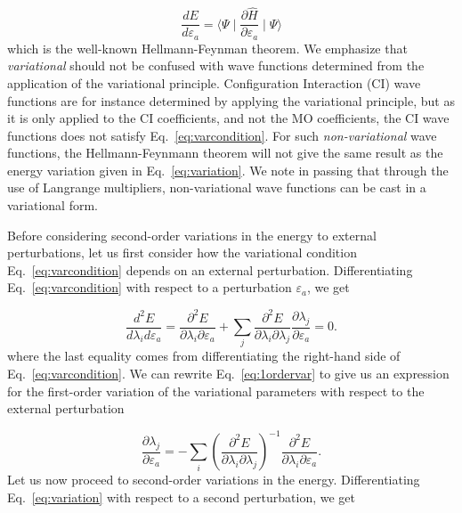 \documentclass[%
 reprint,
 amsmath,amssymb,
 aps,
]{revtex4-1}
\begin{document}
\begin{equation}
\frac{dE}{d\varepsilon_a} = \langle\Psi\mid\frac{\partial
  \hat{H}}{\partial \varepsilon_a}\mid\Psi\rangle
\end{equation}
which is the well-known Hellmann-Feynman theorem. We emphasize that
{\em variational\/} should not be confused with wave functions
determined from the application of the variational
principle. Configuration Interaction (CI) wave functions are for
instance determined by applying the variational principle, but as it
is only applied to the CI coefficients, and not the MO coefficients,
the CI wave functions does not satisfy Eq.~\eqref{eq:varcondition}. For
such {\em non-variational} wave functions, the Hellmann-Feynmann
theorem will not give the same result as the energy variation given in
Eq.~\eqref{eq:variation}. We note in passing that through the use of
Langrange multipliers, non-variational wave functions can be cast in a
variational form.~\cite{HelgakerJorgensen,PRSBook}

Before considering second-order variations in the energy to external
perturbations, let us first consider how the variational condition
Eq.~\eqref{eq:varcondition} depends on an external
perturbation. Differentiating Eq.~\eqref{eq:varcondition} with respect
to a perturbation $\varepsilon_a$, we get

\begin{equation}
\frac{d^2E}{d\lambda_id\varepsilon_a} = 
\frac{\partial^2E}{\partial\lambda_i\partial\varepsilon_a} +
\sum_j\frac{\partial^2E}{\partial\lambda_i\partial\lambda_j}\frac{\partial\lambda_j}{\partial\varepsilon_a}
= 0.\label{eq:1ordervar}
\end{equation}
where the last equality comes from differentiating the right-hand side
of Eq.~\eqref{eq:varcondition}. We can rewrite Eq.~\eqref{eq:1ordervar} to
give us an expression for the first-order variation of the variational
parameters with respect to the external perturbation 

\begin{equation}
\frac{\partial\lambda_j}{\partial\varepsilon_a} =
-\sum_i\left(\frac{\partial^2E}{\partial\lambda_i\partial\lambda_j}\right)^{-1}\frac{\partial^2E}{\partial\lambda_i\partial\varepsilon_a}.
\end{equation}
Let us now proceed to second-order variations in the
energy. Differentiating Eq.~\eqref{eq:variation} with respect to a
second perturbation, we get
\end{document}
